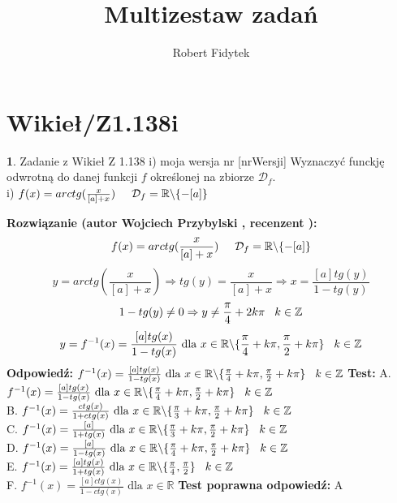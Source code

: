 \documentclass[12pt, a4paper]{article}
\title{Multizestaw zadań}
\author{Robert Fidytek}
\date{}
\theoremstyle{definition} %
\newtheorem{zad}{}
\newcommand{\kategoria}[1]{\section{#1}} %
\newcommand{\zadStart}[1]{\begin{zad}#1\newline} %
\newcommand{\zadStop}{\end{zad}}   %
\newcommand{\rozwStart}[2]{\noindent \textbf{Rozwiązanie (autor #1 , recenzent #2): }\newline} %
\newcommand{\rozwStop}{\newline}                                            %
\newcommand{\odpStart}{\noindent \textbf{Odpowiedź:}\newline}    %
\newcommand{\odpStop}{\newline}                                             %
\newcommand{\testStart}{\noindent \textbf{Test:}\newline} %
\newcommand{\testStop}{\newline} %
\newcommand{\kluczStart}{\noindent \textbf{Test poprawna odpowiedź:}\newline} %
\newcommand{\kluczStop}{\newline} %
\begin{document}
\maketitle


\kategoria{Wikieł/Z1.138i}
\zadStart{Zadanie z Wikieł Z 1.138 i) moja wersja nr [nrWersji]}
Wyznaczyć funckję odwrotną do danej funkcji $f$ określonej na zbiorze $\mathcal{D}_{f}$.\\
i) $f(x)=arctg(\frac{x}{[a]+x})\hspace{5mm}\mathcal{D}_{f}=\mathbb{R}\backslash\{-[a]\}$
\zadStop
\rozwStart{Wojciech Przybylski}{}
$$f(x)=arctg(\frac{x}{[a]+x})\hspace{5mm} \mathcal{D}_{f}=\mathbb{R}\backslash\{-[a]\}$$
$$y=arctg(\frac{x}{[a]+x})\Rightarrow tg(y)=\frac{x}{[a]+x} \Rightarrow x=\frac{[a]tg(y)}{1-tg(y)}$$
$$1-tg(y)\neq0 \Rightarrow y\neq\frac{\pi}{4}+2k\pi\hspace{3mm}k\in\mathbb{Z}$$
$$y=f^{-1}(x)=\frac{[a]tg(x)}{1-tg(x)} \mbox{ dla } x\in \mathbb{R}\backslash\{\frac{\pi}{4}+k\pi,\frac{\pi}{2}+k\pi\}\hspace{3mm}k\in\mathbb{Z}$$
\rozwStop
\odpStart
$f^{-1}(x)=\frac{[a]tg(x)}{1-tg(x)}  \mbox{ dla }x\in \mathbb{R}\backslash\{\frac{\pi}{4}+k\pi,\frac{\pi}{2}+k\pi\}\hspace{3mm}k\in\mathbb{Z}$
\odpStop
\testStart
A. $f^{-1}(x)=\frac{[a]tg(x)}{1-tg(x)}   \mbox{ dla }x\in \mathbb{R}\backslash\{\frac{\pi}{4}+k\pi,\frac{\pi}{2}+k\pi\}\hspace{3mm}k\in\mathbb{Z}$\\
B. $f^{-1}(x)=\frac{ctg(x)}{1+ctg(x)}  \mbox{ dla }x\in \mathbb{R}\backslash\{\frac{\pi}{3}+k\pi,\frac{\pi}{2}+k\pi\}\hspace{3mm}k\in\mathbb{Z}$\\
C. $f^{-1}(x)=\frac{[a]}{1+tg(x)} \mbox{ dla }x\in \mathbb{R}\backslash\{\frac{\pi}{3}+k\pi,\frac{\pi}{2}+k\pi\}\hspace{3mm}k\in\mathbb{Z}$\\
D. $f^{-1}(x)=\frac{[a]}{1-tg(x)} \mbox{ dla }x\in \mathbb{R}\backslash\{\frac{\pi}{4}+k\pi,\frac{\pi}{2}+k\pi\}\hspace{3mm}k\in\mathbb{Z}$\\
E. $f^{-1}(x)=\frac{[a]tg(x)}{1+tg(x)} \mbox{ dla }x\in \mathbb{R}\backslash\{\frac{\pi}{4},\frac{\pi}{2}\}\hspace{3mm}k\in\mathbb{Z}$\\
F. $f^{-1}(x)=\frac{[a]ctg(x)}{1-ctg(x)} \mbox{ dla }x\in \mathbb{R}$
\testStop
\kluczStart
A
\kluczStop
\end{document}
